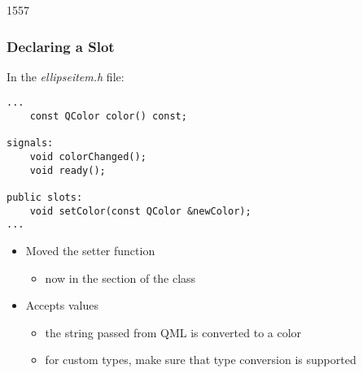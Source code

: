 \begin{slide}[fragile]{1557}\frametitle{Declaring a Slot}

In the \textit{ellipseitem.h} file:

\vspace*{0.25em}
\begin{lstlisting}
...
    const QColor color() const;

signals:
    void colorChanged();
    void ready();

public slots:
    void setColor(const QColor &newColor);
...
\end{lstlisting}

\begin{itemize}
\item Moved the  setter function
  \begin{itemize}
  \item now in the  section of the class
  \end{itemize}
\vspace*{0.25em}
\item Accepts  values
  \begin{itemize}
  \item the string passed from QML is converted to a color
  \item for custom types, make sure that type conversion is supported
  \end{itemize}
\end{itemize}

\end{slide}

